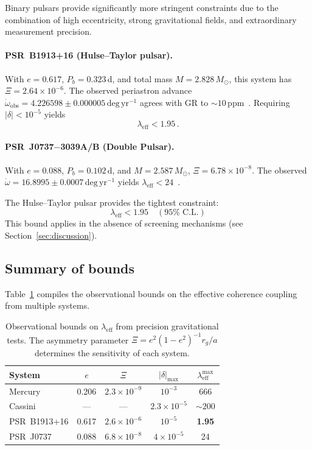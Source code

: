 \documentclass[showpacs,preprintnumbers,amsmath,amssymb,prd,longbibliography]{revtex4-2}
\begin{document}
Binary pulsars provide significantly more stringent constraints
due to the combination of high eccentricity, strong gravitational
fields, and extraordinary measurement precision.

\paragraph{PSR~B1913+16 (Hulse--Taylor pulsar).}
With $e = 0.617$, $P_b = 0.323\,$d, and total mass
$M = 2.828\,M_\odot$, this system has
$\Xi = 2.64 \times 10^{-6}$.
The observed periastron advance
$\dot\omega_{\mathrm{obs}} = 4.226598 \pm 0.000005\,\mathrm{deg\,yr^{-1}}$
agrees with GR to $\sim 10\,$ppm~\cite{Weisberg2016}.
Requiring $|\delta| < 10^{-5}$ yields
\begin{equation}
\lambda_{\mathrm{eff}} < 1.95\,.
\label{eq:psr-bound}
\end{equation}

\paragraph{PSR~J0737$-$3039A/B (Double Pulsar).}
With $e = 0.088$, $P_b = 0.102\,$d, and $M = 2.587\,M_\odot$,
$\Xi = 6.78 \times 10^{-8}$.
The observed $\dot\omega = 16.8995 \pm 0.0007\,\mathrm{deg\,yr^{-1}}$
yields $\lambda_{\mathrm{eff}} < 24$~\cite{Kramer2021}.

The Hulse--Taylor pulsar provides the tightest constraint:
\begin{equation}
\boxed{\lambda_{\mathrm{eff}} < 1.95\quad(95\%\;\mathrm{C.L.})}
\label{eq:lambda-bound}
\end{equation}
This bound applies in the absence of screening mechanisms
(see Section~\ref{sec:discussion}).

\subsection{Summary of bounds}

Table~\ref{tab:bounds} compiles the observational bounds on the
effective coherence coupling from multiple systems.

\begin{table}[b]
\centering
\caption{Observational bounds on $\lambda_{\mathrm{eff}}$ from
precision gravitational tests. The asymmetry parameter
$\Xi = e^2(1{-}e^2)^{-1} r_g/a$ determines the sensitivity
of each system.}
\label{tab:bounds}
\begin{ruledtabular}
\begin{tabular}{lcccc}
System & $e$ & $\Xi$ & $|\delta|_{\max}$ &
$\lambda_{\mathrm{eff}}^{\max}$ \\
\hline
Mercury & 0.206 & $2.3\times10^{-9}$ & $10^{-3}$ & 666 \\
Cassini & --- & --- & $2.3\times10^{-5}$ & $\sim 200$ \\
PSR~B1913+16 & 0.617 & $2.6\times10^{-6}$ & $10^{-5}$ & \textbf{1.95} \\
PSR~J0737 & 0.088 & $6.8\times10^{-8}$ & $4\times10^{-5}$ & 24 \\
\end{tabular}
\end{ruledtabular}
\end{table}
\end{document}
